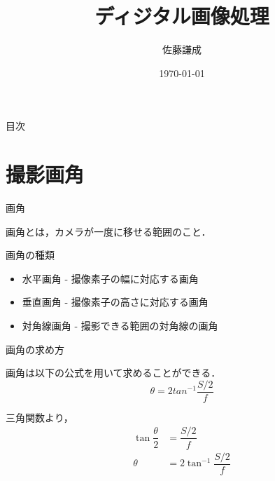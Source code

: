 \documentclass[8pt, jfont=ipaexm, t]{beamer} %
\title{ディジタル画像処理}
\author{佐藤謙成}
\date{\today}
\begin{document}
\maketitle

\begin{frame}{目次}
    \tableofcontents
\end{frame}

\section{撮影画角}
\begin{frame}{画角}
  \begin{block}{}
    画角とは，カメラが一度に移せる範囲のこと．
  \end{block}
  \begin{block}{画角の種類}
    \begin{itemize}
      \item 水平画角 - 撮像素子の幅に対応する画角
      \item 垂直画角 - 撮像素子の高さに対応する画角
      \item 対角線画角 - 撮影できる範囲の対角線の画角
    \end{itemize}
  \end{block}
\end{frame}

\begin{frame}{画角の求め方}
  \begin{block}{}
    画角は以下の公式を用いて求めることができる．
    \begin{equation}
      \theta = 2 tan^{-1} \dfrac{S / 2}{f}
    \end{equation}
  \end{block}
  
  \begin{block}{}
    三角関数より，
    \begin{align*}
      \tan{\dfrac{\theta}{2}} &= \dfrac{S / 2}{f} \\
      \theta &= 2 \tan^{-1}{\dfrac{S / 2}{f}}
    \end{align*}
  \end{block}
\end{frame}
\end{document}
